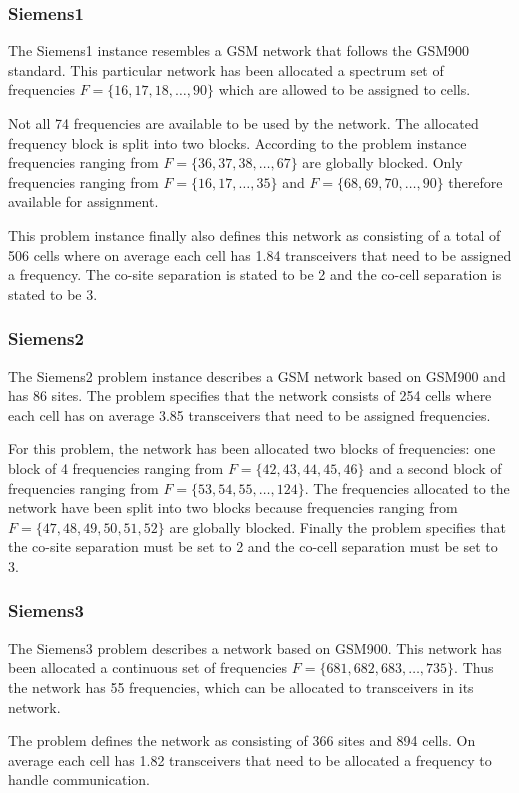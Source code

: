 \subsubsection{Siemens1}
The Siemens1 instance resembles a GSM network that follows the GSM900 standard. This particular network has been allocated a spectrum set of frequencies $F = \{16,17,18,\dots,90\}$ which are allowed to be assigned to cells. 

Not all 74 frequencies are available to be used by the network. The allocated frequency block is split into two blocks. According to the problem instance frequencies ranging from $F= \{36,37,38,\dots,67\}$ are globally blocked. Only frequencies ranging from $F= \{16,17,\dots,35\}$ and $F= \{68,69,70,\dots,90\}$ therefore available for assignment.

This problem instance finally also defines this network as consisting of a total of 506 cells where on average each cell has 1.84 transceivers that need to be assigned a frequency. The co-site separation is stated to be 2 and the co-cell separation is stated to be 3.
\subsubsection{Siemens2}
The Siemens2 problem instance describes a GSM network based on GSM900 and has 86 sites. The problem specifies that the network consists of 254 cells where each cell has on average 3.85 transceivers that need to be assigned frequencies.

For this problem, the network has been allocated two blocks of frequencies: one block of 4 frequencies ranging from $F = \{42,43,44,45,46\}$ and a second block of frequencies ranging from $F= \{53,54,55,\dots,124\}$. The frequencies allocated to the network have been split into two blocks because frequencies ranging from $F = \{47,48,49,50,51,52\}$ are globally blocked. Finally the problem specifies that the co-site separation must be set to 2 and the co-cell separation must be set to 3.
\subsubsection{Siemens3}
The Siemens3 problem describes a network based on GSM900. This network has been allocated a continuous set of frequencies $F= \{681,682,683, \dots, 735\}$. Thus the network has 55 frequencies, which can be allocated to transceivers in its network.

The problem defines the network as consisting of 366 sites and 894 cells. On average each cell has 1.82 transceivers that need to be allocated a frequency to handle communication.
